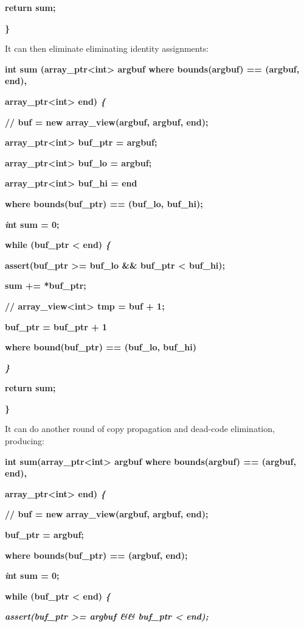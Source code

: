 \documentclass[]{article}
\begin{document}
\textbf{return sum;}

\textbf{\}}

It can then eliminate eliminating identity assignments:

\textbf{int sum (array\_ptr\textless{}int\textgreater{} argbuf where
bounds(argbuf) == (argbuf, end), }

\textbf{array\_ptr\textless{}int\textgreater{} end) \emph{\{}}

\textbf{// buf = new array\_view(argbuf, argbuf, end);}

\textbf{array\_ptr\textless{}int\textgreater{} buf\_ptr = argbuf; }

\textbf{array\_ptr\textless{}int\textgreater{} buf\_lo = argbuf;}

\textbf{array\_ptr\textless{}int\textgreater{} buf\_hi = end}

\textbf{where bounds(buf\_ptr) == (buf\_lo, buf\_hi);}

\textbf{\emph{i}nt sum = 0;}

\textbf{while (buf\_ptr \textless{} end) \emph{\{}}

\textbf{assert(buf\_ptr \textgreater{}= buf\_lo \&\& buf\_ptr
\textless{} buf\_hi);}

\textbf{sum += *buf\_ptr;}

\textbf{// array\_view\textless{}int\textgreater{} tmp = buf + 1;}

\textbf{buf\_ptr = buf\_ptr + 1}

\textbf{where bound(buf\_ptr) == (buf\_lo, buf\_hi)}

\emph{\textbf{\}}}

\textbf{return sum;}

\textbf{\}}

It can do another round of copy propagation and dead-code elimination,
producing:

\textbf{int sum(array\_ptr\textless{}int\textgreater{} argbuf where
bounds(argbuf) == (argbuf, end), }

\textbf{array\_ptr\textless{}int\textgreater{} end) \emph{\{}}

\textbf{// buf = new array\_view(argbuf, argbuf, end);}

\textbf{buf\_ptr = argbuf;}

\textbf{where bounds(buf\_ptr) == (argbuf, end);}

\textbf{\emph{i}nt sum = 0;}

\textbf{while (buf\_ptr \textless{} end) \emph{\{}}

\emph{\textbf{assert(buf\_ptr \textgreater{}= argbuf \&\& buf\_ptr
\textless{} end);}}
\end{document}
